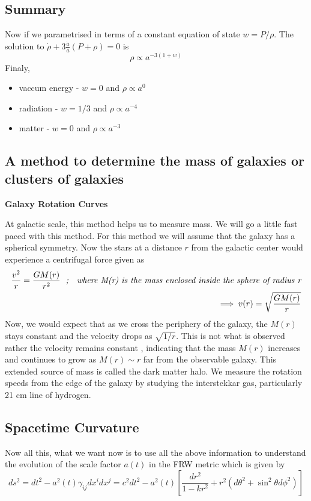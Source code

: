 \documentclass[12pt]{report}
\newcommand{\tbf}[1]{\textbf{#1}}
\newcommand{\tit}[1]{\textit{#1}}
\begin{document}
\subsection*{Summary}
Now if we parametrised in terms of a constant equation of state $w=P/\rho$.  The solution to $\dot{\rho}+3\frac{\dot{a}}{a}(P+\rho)=0$ is 
\begin{equation*}
\rho \propto a^{-3(1+w)}
\end{equation*}
Finaly,
\begin{itemize}
\item vaccum energy -  $w=0$ and $\rho \propto a^0$
\item radiation -  $w=1/3$ and $\rho \propto a^{-4}$
\item matter -  $w=0$ and $\rho \propto a^{-3}$  
\end{itemize} 
\subsection*{A method to determine the mass of galaxies or clusters of galaxies}
\tbf{Galaxy Rotation Curves}

At galactic scale, this method helps us to measure mass. We will go a little fast paced with this method. For this method we will assume that the galaxy has a spherical symmetry. Now the stars at a distance $r$ from the galactic center would experience a centrifugal force given as 
\begin{eqnarray*}
\frac{v^2}{r}=\frac{GM(r)}{r^2}\tit{\; ; \; where M(r) is the mass enclosed inside the sphere of radius r}\\
\implies v(r)=\sqrt{\frac{GM(r)}{r}}
\end{eqnarray*}
Now, we would expect that as we cross the periphery of the galaxy, the $M(r)$ stays constant and the velocity drops as $\sqrt{1/r}$. This is not what is observed rather the velocity remains constant , indicating that the mass $M(r)$ increases and continues to grow as $M(r) \sim r$ far from the observable galaxy. This extended source of mass is called the dark matter halo. We measure the rotation speeds from the edge of the galaxy by studying the interstekkar gas, particularly 21 cm line of hydrogen.
\subsection*{Spacetime Curvature}
Now all this, what we want now is to use all the above information to understand the evolution of the scale factor $a(t)$ in the FRW metric which is given by
\begin{equation*}
ds^2=dt^2- a^2(t)\gamma_{ij}dx^i dx^j=c^2dt^2 - a^2(t)\left[\frac{dr^2}{1-kr^2}+r^2(d\theta^2+ \sin^2 \theta d\phi^2)\right]
\end{equation*}
\end{document}
